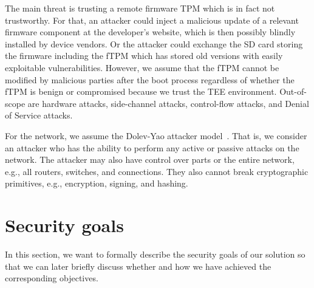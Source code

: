 The main threat is trusting a remote firmware TPM which is in fact not trustworthy.
For that, an attacker could inject a malicious update of a relevant firmware component at the developer's website, which is then possibly blindly installed by device vendors.
Or the attacker could exchange the SD card storing the firmware including the fTPM which has stored old versions with easily exploitable vulnerabilities.
However, we assume that the fTPM cannot be modified by malicious parties after the boot process regardless of whether the fTPM is benign or compromised because we trust the TEE environment.
Out-of-scope are hardware attacks, side-channel attacks, control-flow attacks, and Denial of Service attacks.

For the network, we assume the Dolev-Yao attacker model~\cite{Dolev1983}.
That is, we consider an attacker who has the ability to perform any active or passive attacks on the network.
The attacker may also have control over parts or the entire network, e.g., all routers, switches, and connections.
They also cannot break cryptographic primitives, e.g., encryption, signing, and hashing.

\section{Security goals}

In this section, we want to formally describe the security goals of our solution so that we can later briefly discuss whether and how we have achieved the corresponding objectives.

